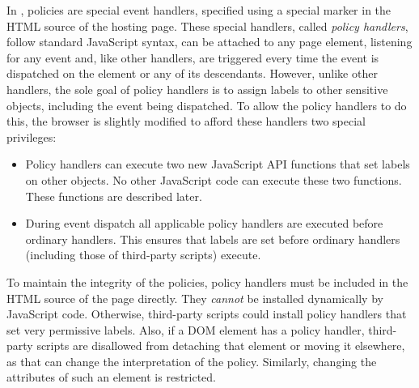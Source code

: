 
In {\sys}, policies are special event handlers, specified using a
special marker in the HTML source of the hosting page. These special
handlers, called \emph{policy handlers}, follow standard JavaScript
syntax, can be attached to any page element, listening for any event
and, like other handlers, are triggered every time the event is
dispatched on the element or any of its descendants. However, unlike
other handlers, the sole goal of policy handlers is to assign labels
to other sensitive objects, including the event being dispatched. To
allow the policy handlers to do this, the browser is slightly modified 
to afford these handlers two special privileges:
\begin{itemize}
\item Policy handlers can execute two new JavaScript API functions
  that set labels on other objects. No other JavaScript code can
  execute these two functions. These functions are described later.
\item During event dispatch all applicable policy handlers are executed
  before ordinary handlers. This ensures that labels are set before
  ordinary handlers (including those of third-party scripts) execute.
\end{itemize}
To maintain the integrity of the policies, policy handlers must be
included in the HTML source of the page directly. They \emph{cannot}
be installed dynamically by JavaScript code. Otherwise, third-party
scripts could install policy handlers that set very permissive labels.
Also, if a DOM element has a policy handler, third-party scripts are
disallowed from detaching that element or moving it elsewhere, as that 
can change the interpretation of the policy. Similarly, changing the
attributes of such an element is restricted.

